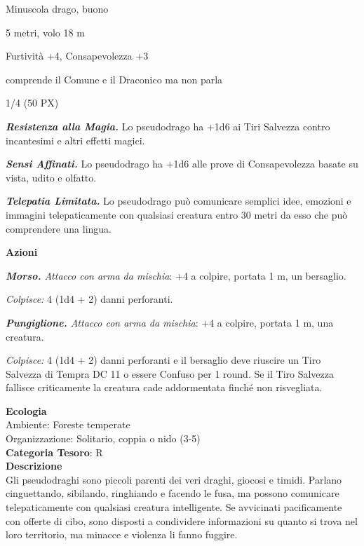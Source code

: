 \begin{multicols}{2}
{
\begin{description}[noitemsep, topsep=0pt, parsep=0pt, partopsep=0pt, itemsep=1pt, leftmargin=2.35cm,  labelwidth=2.2cm, itemindent=0cm, listparindent=0pt] %
\setlength{\baselineskip}{10pt}
\item[\textbf{Taglia/Tipo}] Minuscola drago, buono
\item[\textbf{Caratt.}] 
\item[\textbf{Punti Ferita}] 
\item[\textbf{Movimento}] 5 metri, volo 18 m
\item[\textbf{Tiri Salvez.}] 
\item[\textbf{Comp.}] Furtività +4, Consapevolezza +3
\item[\textbf{Sensi}] 
\item[\textbf{Linguaggi}] comprende il Comune e il Draconico ma non parla
\item[\textbf{Sfida}] 1/4 (50 PX)
\end{description}
\smallskip

\emph{\textbf{Resistenza alla Magia.}} Lo pseudodrago ha +1d6 ai Tiri Salvezza contro incantesimi e altri effetti magici.

\emph{\textbf{Sensi Affinati.}} Lo pseudodrago ha +1d6 alle prove di Consapevolezza basate su vista, udito e olfatto.

\emph{\textbf{Telepatia Limitata.}} Lo pseudodrago può comunicare semplici idee, emozioni e immagini telepaticamente con qualsiasi creatura entro 30 metri da esso che può comprendere una lingua.

\textbf{Azioni}

\emph{\textbf{Morso.} Attacco con arma da mischia}: +4 a colpire, portata 1 m, un bersaglio.

\emph{Colpisce:} 4 (1d4 + 2) danni perforanti.

\emph{\textbf{Pungiglione.} Attacco con arma da mischia}: +4 a colpire, portata 1 m, una creatura.

\emph{Colpisce:} 4 (1d4 + 2) danni perforanti e il bersaglio deve riuscire un Tiro Salvezza di Tempra DC 11 o essere Confuso per 1 round. Se il Tiro Salvezza fallisce criticamente la creatura cade addormentata finché non risvegliata.

\textbf{Ecologia}\\
Ambiente: Foreste temperate\\
Organizzazione: Solitario, coppia o nido (3-5)\\
\textbf{Categoria Tesoro}: R\\
\textbf{Descrizione}\\
Gli pseudodraghi sono piccoli parenti dei veri draghi, giocosi e timidi. Parlano cinguettando, sibilando, ringhiando e facendo le fusa, ma possono comunicare telepaticamente con qualsiasi creatura intelligente. Se avvicinati pacificamente con offerte di cibo, sono disposti a condividere informazioni su quanto si trova nel loro territorio, ma minacce e violenza li fanno fuggire.

}
\end{multicols}
